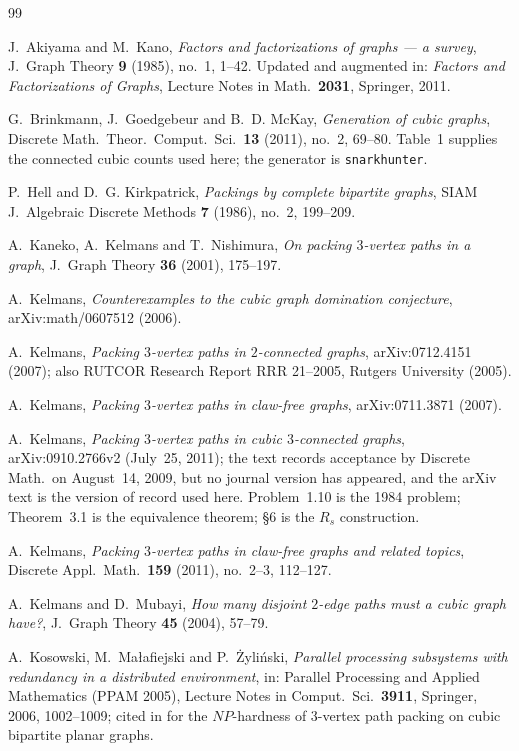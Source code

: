 \documentclass[11pt]{amsart}
\theoremstyle{plain}
\theoremstyle{definition}
\theoremstyle{remark}
\begin{document}
\begin{thebibliography}{99}
\footnotesize

J.~Akiyama and M.~Kano,
\emph{Factors and factorizations of graphs --- a survey},
J.\ Graph Theory \textbf{9} (1985), no.~1, 1--42. Updated and augmented
in: \emph{Factors and Factorizations of Graphs}, Lecture Notes in Math.\
\textbf{2031}, Springer, 2011.

G.~Brinkmann, J.~Goedgebeur and B.~D. McKay,
\emph{Generation of cubic graphs},
Discrete Math.\ Theor.\ Comput.\ Sci.\ \textbf{13} (2011), no.~2,
69--80. Table~1 supplies the connected cubic counts used here; the
generator is \texttt{snarkhunter}.

P.~Hell and D.~G. Kirkpatrick,
\emph{Packings by complete bipartite graphs},
SIAM J.\ Algebraic Discrete Methods \textbf{7} (1986), no.~2, 199--209.

A.~Kaneko, A.~Kelmans and T.~Nishimura,
\emph{On packing $3$-vertex paths in a graph},
J.\ Graph Theory \textbf{36} (2001), 175--197.

A.~Kelmans,
\emph{Counterexamples to the cubic graph domination conjecture},
arXiv:math/0607512 (2006).

A.~Kelmans,
\emph{Packing $3$-vertex paths in $2$-connected graphs},
arXiv:0712.4151 (2007); also RUTCOR Research Report RRR 21--2005,
Rutgers University (2005).

A.~Kelmans,
\emph{Packing $3$-vertex paths in claw-free graphs},
arXiv:0711.3871 (2007).

A.~Kelmans,
\emph{Packing $3$-vertex paths in cubic $3$-connected graphs},
arXiv:0910.2766v2 (July~25, 2011); the text records acceptance by
Discrete Math.\ on August~14, 2009, but no journal version has appeared,
and the arXiv text is the version of record used here. Problem~1.10 is
the 1984 problem; Theorem~3.1 is the equivalence theorem; \S6 is the
$R_s$ construction.

A.~Kelmans,
\emph{Packing $3$-vertex paths in claw-free graphs and related topics},
Discrete Appl.\ Math.\ \textbf{159} (2011), no.~2--3, 112--127.

A.~Kelmans and D.~Mubayi,
\emph{How many disjoint $2$-edge paths must a cubic graph have?},
J.\ Graph Theory \textbf{45} (2004), 57--79.

A.~Kosowski, M.~Ma\l afiejski and P.~\.Zyli\'nski,
\emph{Parallel processing subsystems with redundancy in a distributed
environment},
in: Parallel Processing and Applied Mathematics (PPAM 2005), Lecture
Notes in Comput.\ Sci.\ \textbf{3911}, Springer, 2006, 1002--1009; cited
in \cite{Kel11} for the $NP$-hardness of $3$-vertex path packing on cubic
bipartite planar graphs.


\end{thebibliography}
\end{document}
